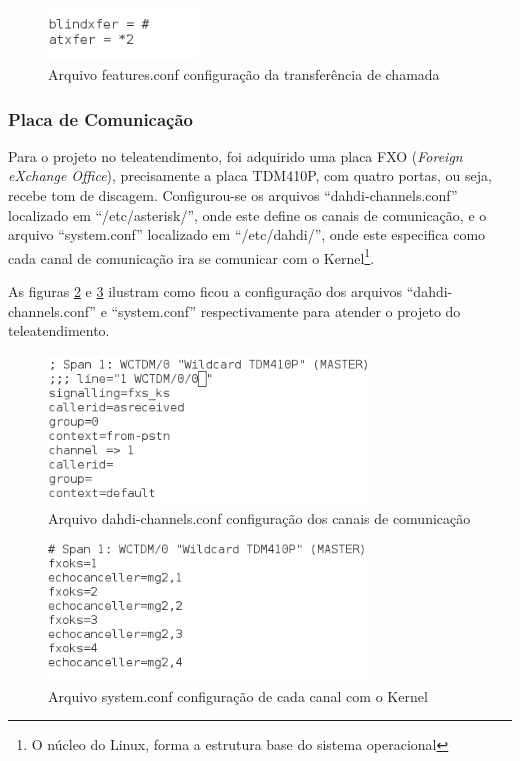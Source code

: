 \begin{figure}[h]
	\centering
	\includegraphics[width=4cm]{imagens/features2.png}
	\caption{Arquivo features.conf configuração da transferência de chamada}
    \label{Figura25}
\end{figure}

\subsubsection{Placa de Comunicação}

Para o projeto no teleatendimento, foi adquirido uma placa FXO (\textit{Foreign eXchange Office}), precisamente a placa TDM410P, com quatro portas, ou seja, recebe tom de discagem. Configurou-se os arquivos ``dahdi-channels.conf'' localizado em ``/etc/asterisk/'', onde este define os canais de comunicação, e o arquivo ``system.conf'' localizado em ``/etc/dahdi/'', onde este especifica como cada canal de comunicação ira se comunicar com o Kernel\footnote{O núcleo do Linux, forma a estrutura base do sistema operacional}.

As figuras \ref{Figura26} e \ref{Figura27} ilustram como ficou a configuração dos arquivos ``dahdi-channels.conf'' e ``system.conf'' respectivamente para atender o projeto do teleatendimento.

\begin{figure}[h]
	\centering
	\includegraphics[width=8.5cm]{imagens/dahdi-chan.png}
	\caption{Arquivo dahdi-channels.conf configuração dos canais de comunicação}
    \label{Figura26}
\end{figure}

\begin{figure}[h]
	\centering
	\includegraphics[width=8.5cm]{imagens/system.png}
	\caption{Arquivo system.conf configuração de cada canal com o Kernel}
    \label{Figura27}
\end{figure}

